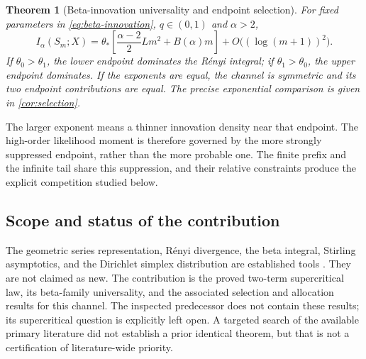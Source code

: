 \documentclass[11pt,a4paper]{article}
\numberwithin{equation}{section}
\newtheorem{theorem}{Theorem}[section]
\theoremstyle{definition}\newaliascnt{definition}{theorem}
\theoremstyle{remark}\newaliascnt{remark}{theorem}
\begin{document}
\begin{theorem}[Beta-innovation universality and endpoint selection]
\label{thm:beta-main}
For fixed parameters in \eqref{eq:beta-innovation}, $q\in(0,1)$ and
$\alpha>2$,
\begin{equation}
 I_\alpha(S_m;X)
   =\theta_*\left[\frac{\alpha-2}{2}Lm^2+B(\alpha)m\right]
     +O\bigl((\log(m+1))^2\bigr).
 \label{eq:beta-main}
\end{equation}
If $\theta_0>\theta_1$, the lower endpoint dominates the R\'enyi integral;
if $\theta_1>\theta_0$, the upper endpoint dominates. If the exponents are
equal, the channel is symmetric and its two endpoint contributions are equal.
The precise exponential comparison is given in \cref{cor:selection}.
\end{theorem}
The larger exponent means a thinner innovation density near that endpoint.
The high-order likelihood moment is therefore governed by the more strongly
suppressed endpoint, rather than the more probable one. The finite prefix
and the infinite tail share this suppression, and their relative constraints
produce the explicit competition studied below.

\subsection{Scope and status of the contribution}
The geometric series representation, R\'enyi divergence, the beta integral,
Stirling asymptotics, and the Dirichlet simplex distribution are established
tools \cite{arias,renyi,dlmf-beta,dlmf-gamma}. They are not claimed as new.
The contribution is the proved two-term supercritical law, its beta-family
universality, and the associated selection and allocation results for this
channel. The inspected predecessor does not contain these results; its
supercritical question is explicitly left open. A targeted search of the
available primary literature did not establish a prior identical theorem,
but that is not a certification of literature-wide priority.
\end{document}
